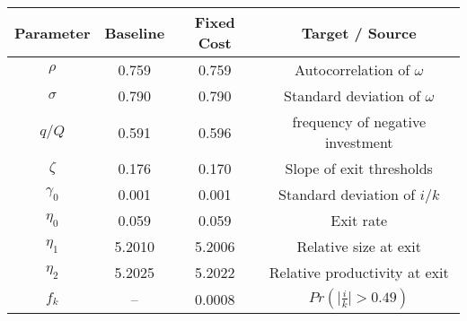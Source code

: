 {\fontshape\scdefault\selectfont 
\begin{tabular}{cccc}  
\hline\hline  
 Parameter & Baseline & Fixed Cost & Target / Source  \\  
 			\hline  
$\rho$ &0.759&0.759& Autocorrelation of $\omega$ \\  
 $\sigma$ &0.790&0.790& Standard deviation of $\omega$ \\  
 $q/Q$ &0.591&0.596& frequency of negative investment \\  
 $\zeta$ &0.176&0.170& Slope of exit thresholds \\  
 $\gamma_0$ &0.001&0.001& Standard deviation of $i/k$ \\  
 $\eta_0$ &0.059&0.059& Exit rate \\  
 $\eta_1$ &5.2010&5.2006& Relative size at exit \\  
 $\eta_2$ &5.2025&5.2022& Relative productivity at exit \\  
 $f_k$ &-- &0.0008& $Pr \left( \vert \frac{i}{k} \vert > 0.49 \right)$ \\  
 \hline\hline  
 \end{tabular}  
 }  
